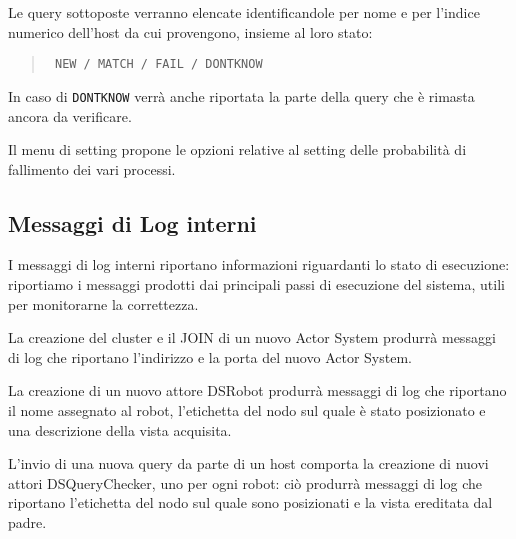 Le query sottoposte verranno elencate identificandole per nome e per l'indice
numerico dell'host da cui provengono, insieme al loro stato:
\begin{quote}\texttt{
    NEW / MATCH / FAIL / DONTKNOW
    }
\end{quote}

In caso di \texttt{DONTKNOW} verrà anche riportata la parte della query che è
rimasta ancora da verificare.

Il menu di setting propone le opzioni relative al setting delle probabilità
di fallimento dei vari processi.

\subsection{Messaggi di Log interni}
I messaggi di log interni riportano informazioni riguardanti lo stato di
esecuzione: riportiamo i messaggi prodotti dai principali passi di
esecuzione del sistema, utili per monitorarne la correttezza.

La creazione del cluster e il JOIN di un nuovo Actor System produrrà messaggi di log
che riportano l'indirizzo e la porta del nuovo Actor System.


La creazione di un nuovo attore DSRobot produrrà messaggi di log che riportano
il nome assegnato al robot, l'etichetta del nodo sul quale è stato posizionato
e una descrizione della vista acquisita.


L'invio di una nuova query da parte di un host comporta la creazione di nuovi attori DSQueryChecker,
uno per ogni robot: ciò produrrà messaggi di log che riportano
l'etichetta del nodo sul quale sono posizionati e la vista ereditata dal padre.


